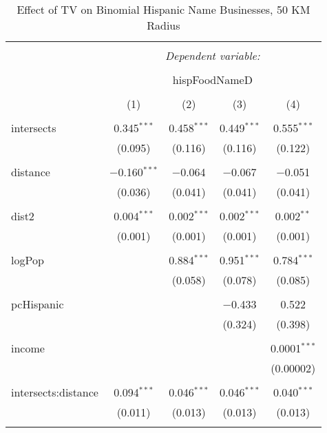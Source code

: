 
\begin{table}[!htbp] \centering 
  \caption{Effect of TV on Binomial Hispanic Name Businesses, 50 KM Radius} 
  \label{} 
\begin{tabular}{@{\extracolsep{-5pt}}lcccc} 
\\[-1.8ex]\hline 
\hline \\[-1.8ex] 
 & \multicolumn{4}{c}{\textit{Dependent variable:}} \\ 
\cline{2-5} 
\\[-1.8ex] & \multicolumn{4}{c}{hispFoodNameD} \\ 
\\[-1.8ex] & (1) & (2) & (3) & (4)\\ 
\hline \\[-1.8ex] 
 intersects & 0.345$^{***}$ & 0.458$^{***}$ & 0.449$^{***}$ & 0.555$^{***}$ \\ 
  & (0.095) & (0.116) & (0.116) & (0.122) \\ 
  & & & & \\ 
 distance & $-$0.160$^{***}$ & $-$0.064 & $-$0.067 & $-$0.051 \\ 
  & (0.036) & (0.041) & (0.041) & (0.041) \\ 
  & & & & \\ 
 dist2 & 0.004$^{***}$ & 0.002$^{***}$ & 0.002$^{***}$ & 0.002$^{**}$ \\ 
  & (0.001) & (0.001) & (0.001) & (0.001) \\ 
  & & & & \\ 
 logPop &  & 0.884$^{***}$ & 0.951$^{***}$ & 0.784$^{***}$ \\ 
  &  & (0.058) & (0.078) & (0.085) \\ 
  & & & & \\ 
 pcHispanic &  &  & $-$0.433 & 0.522 \\ 
  &  &  & (0.324) & (0.398) \\ 
  & & & & \\ 
 income &  &  &  & 0.0001$^{***}$ \\ 
  &  &  &  & (0.00002) \\ 
  & & & & \\ 
 intersects:distance & 0.094$^{***}$ & 0.046$^{***}$ & 0.046$^{***}$ & 0.040$^{***}$ \\ 
  & (0.011) & (0.013) & (0.013) & (0.013) \\ 
  & & & & \\ 

\end{tabular}
\end{table}
